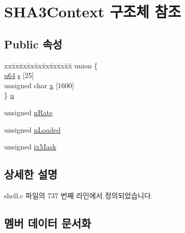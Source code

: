 \hypertarget{struct_s_h_a3_context}{}\section{S\+H\+A3\+Context 구조체 참조}
\label{struct_s_h_a3_context}
\subsection*{Public 속성}
\begin{DoxyCompactItemize}
\item 
\begin{tabbing}
xx\=xx\=xx\=xx\=xx\=xx\=xx\=xx\=xx\=\kill
union \{\\
\>\hyperlink{shell_8c_a510e88e5fe50c5bcf5b3ff1ad131e109}{u64} \hyperlink{struct_s_h_a3_context_ac353f0d611651d2f23a0da1223950f8a}{s} \mbox{[}25\mbox{]}\\
\>unsigned char \hyperlink{struct_s_h_a3_context_afed763dce136f918c20ad99a8ec28adc}{x} \mbox{[}1600\mbox{]}\\
\} \hyperlink{struct_s_h_a3_context_a9b772ee291e315531a1e88688ff82b69}{u}\\

\end{tabbing}\item 
unsigned \hyperlink{struct_s_h_a3_context_a22fc5e072ef8924400267fee73dfb23f}{n\+Rate}
\item 
unsigned \hyperlink{struct_s_h_a3_context_aa4e83212aa13ac9f1eb3e42f831da090}{n\+Loaded}
\item 
unsigned \hyperlink{struct_s_h_a3_context_a970ac15a9c7454ff82f81f9764e3ff4d}{ix\+Mask}
\end{DoxyCompactItemize}


\subsection{상세한 설명}


shell.\+c 파일의 737 번째 라인에서 정의되었습니다.



\subsection{멤버 데이터 문서화}
\mbox{\label{struct_s_h_a3_context_a970ac15a9c7454ff82f81f9764e3ff4d}} 
